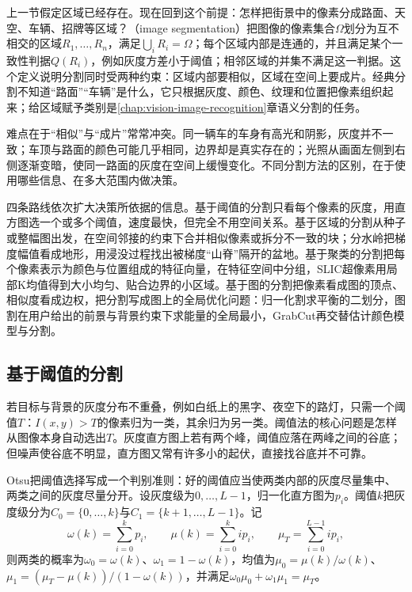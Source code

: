 上一节假定区域已经存在。现在回到这个前提：怎样把街景中的像素分成路面、天空、车辆、招牌等区域？（image segmentation）把图像的像素集合$\Omega$划分为互不相交的区域$R_1,\ldots,R_n$，满足$\bigcup_iR_i=\Omega$；每个区域内部是连通的，并且满足某个一致性判据$Q(R_i)$，例如灰度方差小于阈值；相邻区域的并集不满足这一判据。这个定义说明分割同时受两种约束：区域内部要相似，区域在空间上要成片。经典分割不知道“路面”“车辆”是什么，它只根据灰度、颜色、纹理和位置把像素组织起来；给区域赋予类别是\ref{chap:vision-image-recognition}章语义分割的任务。

难点在于“相似”与“成片”常常冲突。同一辆车的车身有高光和阴影，灰度并不一致；车顶与路面的颜色可能几乎相同，边界却是真实存在的；光照从画面左侧到右侧逐渐变暗，使同一路面的灰度在空间上缓慢变化。不同分割方法的区别，在于使用哪些信息、在多大范围内做决策。

四条路线依次扩大决策所依据的信息。基于阈值的分割只看每个像素的灰度，用直方图选一个或多个阈值，速度最快，但完全不用空间关系。基于区域的分割从种子或整幅图出发，在空间邻接的约束下合并相似像素或拆分不一致的块；分水岭把梯度幅值看成地形，用浸没过程找出被梯度“山脊”隔开的盆地。基于聚类的分割把每个像素表示为颜色与位置组成的特征向量，在特征空间中分组，SLIC超像素用局部K均值得到大小均匀、贴合边界的小区域。基于图的分割把像素看成图的顶点、相似度看成边权，把分割写成图上的全局优化问题：归一化割求平衡的二划分，图割在用户给出的前景与背景约束下求能量的全局最小，GrabCut再交替估计颜色模型与分割。

\subsection{基于阈值的分割}
\label{sec:vision-features-otsu}
\label{sec:vision-features-threshold}

若目标与背景的灰度分布不重叠，例如白纸上的黑字、夜空下的路灯，只需一个阈值$T$：$I(x,y)>T$的像素归为一类，其余归为另一类。阈值法的核心问题是怎样从图像本身自动选出$T$。灰度直方图上若有两个峰，阈值应落在两峰之间的谷底；但噪声使谷底不明显，直方图又常有许多小的起伏，直接找谷底并不可靠。

Otsu把阈值选择写成一个判别准则：好的阈值应当使两类内部的灰度尽量集中、两类之间的灰度尽量分开。设灰度级为$0,\ldots,L-1$，归一化直方图为$p_i$。阈值$k$把灰度级分为$C_0=\{0,\ldots,k\}$与$C_1=\{k+1,\ldots,L-1\}$。记
\[
  \omega(k)=\sum_{i=0}^{k}p_i,\qquad \mu(k)=\sum_{i=0}^{k}ip_i,\qquad \mu_T=\sum_{i=0}^{L-1}ip_i,
\]
则两类的概率为$\omega_0=\omega(k)$、$\omega_1=1-\omega(k)$，均值为$\mu_0=\mu(k)/\omega(k)$、$\mu_1=(\mu_T-\mu(k))/(1-\omega(k))$，并满足$\omega_0\mu_0+\omega_1\mu_1=\mu_T$。

